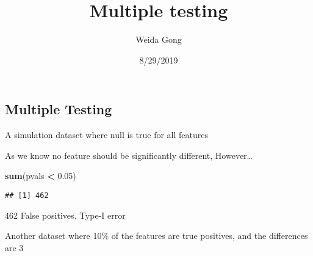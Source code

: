\documentclass[]{article}
\title{Multiple testing}
\author{Weida Gong}
\date{8/29/2019}
\newenvironment{Shaded}{\begin{snugshade}}{\end{snugshade}}
\newcommand{\DataTypeTok}[1]{\textcolor[rgb]{0.13,0.29,0.53}{#1}}
\newcommand{\DecValTok}[1]{\textcolor[rgb]{0.00,0.00,0.81}{#1}}
\newcommand{\FloatTok}[1]{\textcolor[rgb]{0.00,0.00,0.81}{#1}}
\newcommand{\KeywordTok}[1]{\textcolor[rgb]{0.13,0.29,0.53}{\textbf{#1}}}
\newcommand{\NormalTok}[1]{#1}
\newcommand{\OperatorTok}[1]{\textcolor[rgb]{0.81,0.36,0.00}{\textbf{#1}}}
\newcommand{\StringTok}[1]{\textcolor[rgb]{0.31,0.60,0.02}{#1}}
\begin{document}
\maketitle

\hypertarget{multiple-testing}{%
\subsection{Multiple Testing}\label{multiple-testing}}

A simulation dataset where null is true for all features

\begin{Shaded}
\end{Shaded}

As we know no feature should be significantly different, However\ldots{}

\begin{Shaded}
\begin{Highlighting}[]
\KeywordTok{sum}\NormalTok{(pvals }\OperatorTok{<}\StringTok{ }\FloatTok{0.05}\NormalTok{)}
\end{Highlighting}
\end{Shaded}

\begin{verbatim}
## [1] 462
\end{verbatim}

462 False positives. Type-I error

Another dataset where 10\% of the features are true positives, and the
differences are 3
\end{document}
